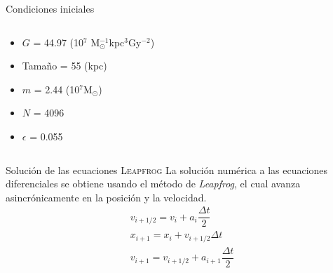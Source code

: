 \documentclass{beamer}
\begin{document}
\begin{frame}{Condiciones iniciales}
\begin{columns}
\begin{column}{0.65\textwidth}
			\footnotesize
			\begin{itemize}
				\item $G$ = 44.97 (10$^7$ M$_{\odot}^{-1}$kpc$^3$Gy$^{-2}$)
				\item Tama\~no = 55 (kpc)
				\item $m$ = 2.44 (10$^7$M$_{\odot}$)
				\item $N$ = 4096
				\item $\epsilon$ = 0.055
			\end{itemize}
		\end{column}
	\end{columns}
\end{frame}
\begin{frame}{Soluci\'on de las ecuaciones}
	{\scshape Leapfrog}
	La soluci\'on num\'erica a las ecuaciones diferenciales se obtiene usando el m\'etodo de \textit{Leapfrog}, el cual avanza asincr\'onicamente en la posici\'on y la velocidad.
	\begin{equation}
		\begin{matrix}
			v_{i+1/2} = v_i + a_i\dfrac{\Delta t}{2}\\
			x_{i+1} = x_i + v_{i+1/2}\Delta t \\
			v_{i+1} = v_{i+1/2}+a_{i+1}\dfrac{\Delta t}{2}
		\end{matrix}
	\end{equation}
\end{frame}
\end{document}
